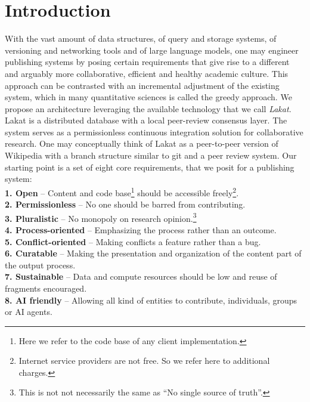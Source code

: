 
\section{Introduction}
\label{sc:introduction}

With the vast amount of data structures, of query and storage systems, of versioning and networking tools and of large language models, one may engineer publishing systems by posing certain requirements that give rise to a different and arguably more collaborative, efficient and healthy academic culture. This approach can be contrasted with an incremental adjustment of the existing system, which in many quantitative sciences is called the greedy approach. We propose an architecture leveraging the available technology that we call \textit{Lakat}.
Lakat is a distributed database with a local peer-review consensus layer. The system serves as a permissionless continuous integration solution for collaborative research. One may conceptually think of Lakat as a peer-to-peer version of Wikipedia with a branch structure similar to git and a peer review system.
Our starting point is a set of eight core requirements, that we posit for a publishing system:\\

\indent \textbf{1. Open} -- 
 Content and code base\footnote{Here we refer to the code base of any client implementation.} should be accessible freely\footnote{Internet service providers are not free. So we refer here to additional charges.}.\\
\indent\textbf{2. Permissionless} --
 No one should be barred from contributing.\\
\indent\textbf{3. Pluralistic} -- No monopoly on research opinion.\footnote{This is not not necessarily the same as ``No single source of truth''.}\\
\indent\textbf{4. Process-oriented} -- Emphasizing the process rather than an outcome.\\
\indent\textbf{5. Conflict-oriented} -- Making conflicts a feature rather than a bug.\\
\indent\textbf{6. Curatable} -- Making the presentation and organization of the content part of the output process.\\
\indent\textbf{7. Sustainable} -- 
 Data and compute resources should be low and reuse of fragments encouraged.\\
\indent\textbf{8. AI friendly} -- Allowing all kind of entities to contribute, individuals, groups or AI agents.\\

